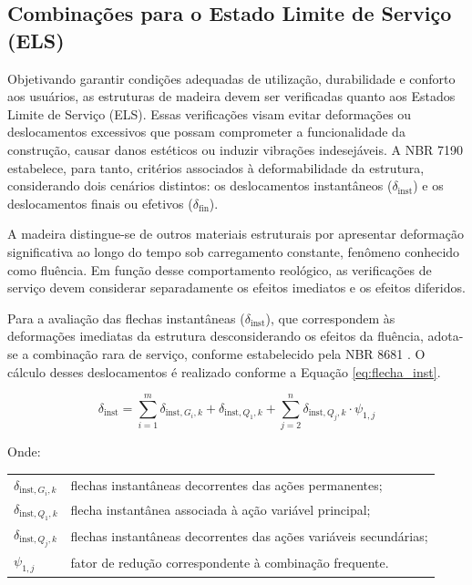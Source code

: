 \subsection{Combinações para o Estado Limite de Serviço (ELS)}

Objetivando garantir condições adequadas de utilização, durabilidade e conforto aos usuários, as estruturas de madeira devem ser verificadas quanto aos Estados Limite de Serviço (ELS). Essas verificações visam evitar deformações ou deslocamentos excessivos que possam comprometer a funcionalidade da construção, causar danos estéticos ou induzir vibrações indesejáveis. A NBR 7190 \parencite{NBR7190-1:2022} estabelece, para tanto, critérios associados à deformabilidade da estrutura, considerando dois cenários distintos: os deslocamentos instantâneos ($\delta_{\mathrm{inst}}$) e os deslocamentos finais ou efetivos ($\delta_{\mathrm{fin}}$).

A madeira distingue-se de outros materiais estruturais por apresentar deformação significativa ao longo do tempo sob carregamento constante, fenômeno conhecido como fluência. Em função desse comportamento reológico, as verificações de serviço devem considerar separadamente os efeitos imediatos e os efeitos diferidos.

Para a avaliação das flechas instantâneas ($\delta_{\mathrm{inst}}$), que correspondem às deformações imediatas da estrutura desconsiderando os efeitos da fluência, adota-se a combinação rara de serviço, conforme estabelecido pela NBR 8681 \parencite{NBR8681:2025}. O cálculo desses deslocamentos é realizado conforme a Equação \eqref{eq:flecha_inst}.

\begin{equation}
\delta_{\mathrm{inst}} =
\sum_{i=1}^{m} \delta_{\mathrm{inst},G_i,k}
+ \delta_{\mathrm{inst},Q_1,k}
+ \sum_{j=2}^{n} \delta_{\mathrm{inst},Q_j,k} \cdot \psi_{1,j}
\label{eq:flecha_inst}
\end{equation}

Onde:

\begin{tabular}{ll}
$\delta_{\mathrm{inst},G_i,k}$ & flechas instantâneas decorrentes das ações permanentes; \\
$\delta_{\mathrm{inst},Q_1,k}$ & flecha instantânea associada à ação variável principal; \\
$\delta_{\mathrm{inst},Q_j,k}$ & flechas instantâneas decorrentes das ações variáveis secundárias; \\
$\psi_{1,j}$ & fator de redução correspondente à combinação frequente.
\end{tabular}

